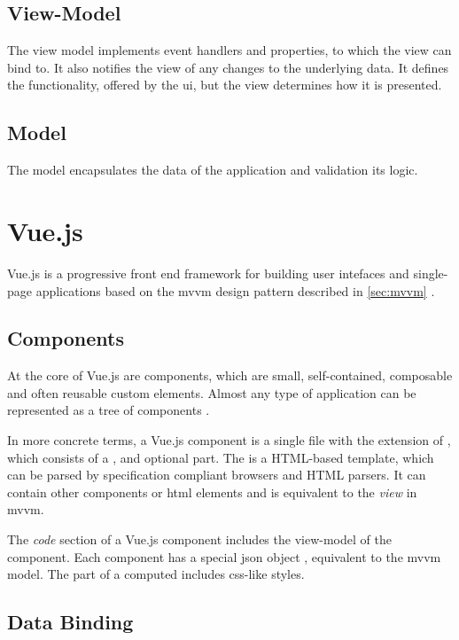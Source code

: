 \subsection{View-Model}
The view model implements event handlers and properties, to which the view can bind to. It also notifies the view of any changes to the underlying data. It defines the functionality, offered by the \gls{ui}, but the view determines how it is presented. 
\subsection{Model}
The model encapsulates the data of the application and validation its logic.


\section{Vue.js}

Vue.js \parencite{vuejs_gh} is a progressive front end framework for building user intefaces and single-page applications based on the \gls{mvvm} design pattern described in \ref{sec:mvvm} \parencite{vuejs_book} \parencite{vuejs_guide}.  

\subsection{Components}
At the core of Vue.js are components, which are small, self-contained, composable and often reusable custom elements. Almost any type of application can be represented as a tree of components \parencite{vuejs_guide}. 

In more concrete terms, a Vue.js component is a single file with the extension of , which consists of a ,  and optional  part. The  is a HTML-based template, which can be parsed by specification compliant browsers and HTML parsers. It can contain other components or html elements and is equivalent to the \textit{view} in \gls{mvvm}. 

The \textit{code} section of a Vue.js component includes the view-model of the component. Each component has a special json object , equivalent to the \gls{mvvm} model.
The  part of a computed includes css-like styles.

\subsection{Data Binding}

